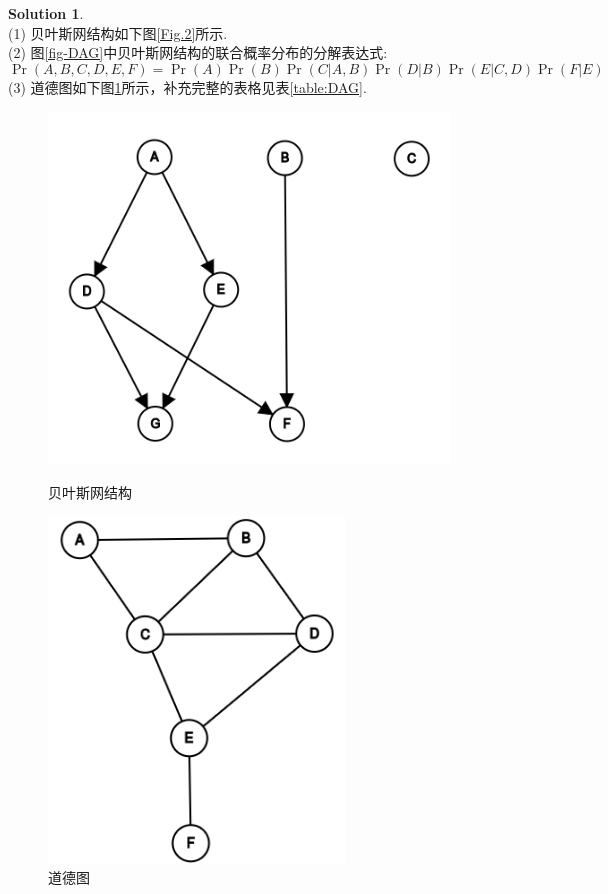 \documentclass[a4paper,UTF8]{article}
\theoremstyle{definition}
\newtheorem*{solution}{Solution}
\begin{document}
\begin{solution}
~\\(1) 贝叶斯网结构如下图\ref{Fig.2}所示.
 \\(2) 图\ref{fig-DAG}中贝叶斯网结构的联合概率分布的分解表达式:
\begin{equation*}
 \Pr(A, B, C, D, E, F) = \Pr(A)\Pr(B)\Pr(C|A,B)\Pr(D|B)\Pr(E|C,D)\Pr(F|E)
\end{equation*} 
 (3) 道德图如下图\ref{Fig.3}所示，补充完整的表格见表\ref{table:DAG}.
\begin{figure}[H]
\centering 
\begin{minipage}[b]{0.47\textwidth}
\centering %
\includegraphics[width=0.95\textwidth]{graph.png} 
\caption{贝叶斯网结构}
\label{Fig.2}
\end{minipage}
\begin{minipage}[b]{0.45\textwidth}
\centering %
\includegraphics[width=0.7\textwidth]{graph2.png}
\caption{道德图}
\label{Fig.3}
\end{minipage}
\end{figure}

\end{solution}
\end{document}
